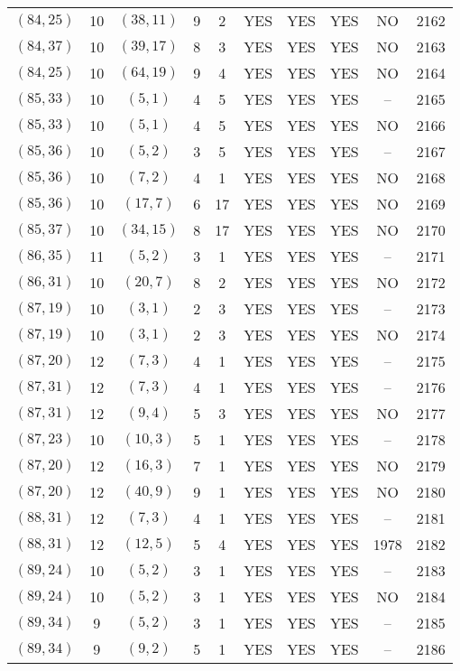 \begin{longtable}{|c|c|c|c|c|c|c|c|c|c|}
$(84, 25)$ & 10 & $(38, 11)$ & 9 & 2 & YES & YES & YES & NO & 2162\\
$(84, 37)$ & 10 & $(39, 17)$ & 8 & 3 & YES & YES & YES & NO & 2163\\
$(84, 25)$ & 10 & $(64, 19)$ & 9 & 4 & YES & YES & YES & NO & 2164\\
$(85, 33)$ & 10 & $(5, 1)$ & 4 & 5 & YES & YES & YES & -- & 2165\\
$(85, 33)$ & 10 & $(5, 1)$ & 4 & 5 & YES & YES & YES & NO & 2166\\
$(85, 36)$ & 10 & $(5, 2)$ & 3 & 5 & YES & YES & YES & -- & 2167\\
$(85, 36)$ & 10 & $(7, 2)$ & 4 & 1 & YES & YES & YES & NO & 2168\\
$(85, 36)$ & 10 & $(17, 7)$ & 6 & 17 & YES & YES & YES & NO & 2169\\
$(85, 37)$ & 10 & $(34, 15)$ & 8 & 17 & YES & YES & YES & NO & 2170\\
$(86, 35)$ & 11 & $(5, 2)$ & 3 & 1 & YES & YES & YES & -- & 2171\\
$(86, 31)$ & 10 & $(20, 7)$ & 8 & 2 & YES & YES & YES & NO & 2172\\
$(87, 19)$ & 10 & $(3, 1)$ & 2 & 3 & YES & YES & YES & -- & 2173\\
$(87, 19)$ & 10 & $(3, 1)$ & 2 & 3 & YES & YES & YES & NO & 2174\\
$(87, 20)$ & 12 & $(7, 3)$ & 4 & 1 & YES & YES & YES & -- & 2175\\
$(87, 31)$ & 12 & $(7, 3)$ & 4 & 1 & YES & YES & YES & -- & 2176\\
$(87, 31)$ & 12 & $(9, 4)$ & 5 & 3 & YES & YES & YES & NO & 2177\\
$(87, 23)$ & 10 & $(10, 3)$ & 5 & 1 & YES & YES & YES & -- & 2178\\
$(87, 20)$ & 12 & $(16, 3)$ & 7 & 1 & YES & YES & YES & NO & 2179\\
$(87, 20)$ & 12 & $(40, 9)$ & 9 & 1 & YES & YES & YES & NO & 2180\\
$(88, 31)$ & 12 & $(7, 3)$ & 4 & 1 & YES & YES & YES & -- & 2181\\
$(88, 31)$ & 12 & $(12, 5)$ & 5 & 4 & YES & YES & YES & 1978 & 2182\\
$(89, 24)$ & 10 & $(5, 2)$ & 3 & 1 & YES & YES & YES & -- & 2183\\
$(89, 24)$ & 10 & $(5, 2)$ & 3 & 1 & YES & YES & YES & NO & 2184\\
$(89, 34)$ & 9 & $(5, 2)$ & 3 & 1 & YES & YES & YES & -- & 2185\\
$(89, 34)$ & 9 & $(9, 2)$ & 5 & 1 & YES & YES & YES & -- & 2186\\

\end{longtable}
